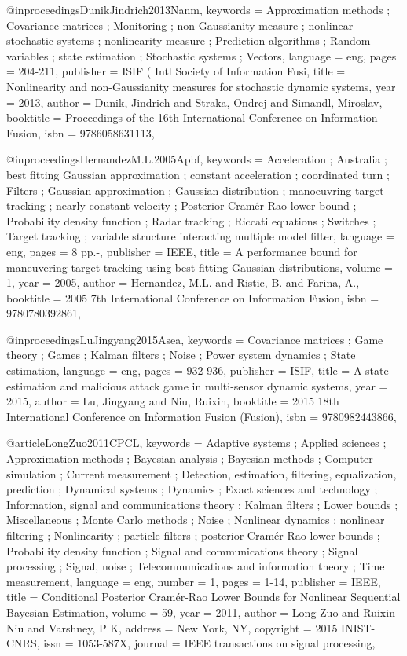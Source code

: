 @inproceedings{DunikJindrich2013Nanm,
keywords = {Approximation methods ; Covariance matrices ; Monitoring ; non-Gaussianity measure ; nonlinear stochastic systems ; nonlinearity measure ; Prediction algorithms ; Random variables ; state estimation ; Stochastic systems ; Vectors},
language = {eng},
pages = {204-211},
publisher = {ISIF ( Intl Society of Information Fusi},
title = {Nonlinearity and non-Gaussianity measures for stochastic dynamic systems},
year = {2013},
author = {Dunik, Jindrich and Straka, Ondrej and Simandl, Miroslav},
booktitle = {Proceedings of the 16th International Conference on Information Fusion},
isbn = {9786058631113},
}

@inproceedings{HernandezM.L.2005Apbf,
keywords = {Acceleration ; Australia ; best fitting Gaussian approximation ; constant acceleration ; coordinated turn ; Filters ; Gaussian approximation ; Gaussian distribution ; manoeuvring target tracking ; nearly constant velocity ; Posterior Cramér-Rao lower bound ; Probability density function ; Radar tracking ; Riccati equations ; Switches ; Target tracking ; variable structure interacting multiple model filter},
language = {eng},
pages = {8 pp.-},
publisher = {IEEE},
title = {A performance bound for maneuvering target tracking using best-fitting Gaussian distributions},
volume = {1},
year = {2005},
author = {Hernandez, M.L. and Ristic, B. and Farina, A.},
booktitle = {2005 7th International Conference on Information Fusion},
isbn = {9780780392861},
}

@inproceedings{LuJingyang2015Asea,
keywords = {Covariance matrices ; Game theory ; Games ; Kalman filters ; Noise ; Power system dynamics ; State estimation},
language = {eng},
pages = {932-936},
publisher = {ISIF},
title = {A state estimation and malicious attack game in multi-sensor dynamic systems},
year = {2015},
author = {Lu, Jingyang and Niu, Ruixin},
booktitle = {2015 18th International Conference on Information Fusion (Fusion)},
isbn = {9780982443866},
}

@article{LongZuo2011CPCL,
keywords = {Adaptive systems ; Applied sciences ; Approximation methods ; Bayesian analysis ; Bayesian methods ; Computer simulation ; Current measurement ; Detection, estimation, filtering, equalization, prediction ; Dynamical systems ; Dynamics ; Exact sciences and technology ; Information, signal and communications theory ; Kalman filters ; Lower bounds ; Miscellaneous ; Monte Carlo methods ; Noise ; Nonlinear dynamics ; nonlinear filtering ; Nonlinearity ; particle filters ; posterior Cramér-Rao lower bounds ; Probability density function ; Signal and communications theory ; Signal processing ; Signal, noise ; Telecommunications and information theory ; Time measurement},
language = {eng},
number = {1},
pages = {1-14},
publisher = {IEEE},
title = {Conditional Posterior Cramér-Rao Lower Bounds for Nonlinear Sequential Bayesian Estimation},
volume = {59},
year = {2011},
author = {Long Zuo and Ruixin Niu and Varshney, P K},
address = {New York, NY},
copyright = {2015 INIST-CNRS},
issn = {1053-587X},
journal = {IEEE transactions on signal processing},
}

